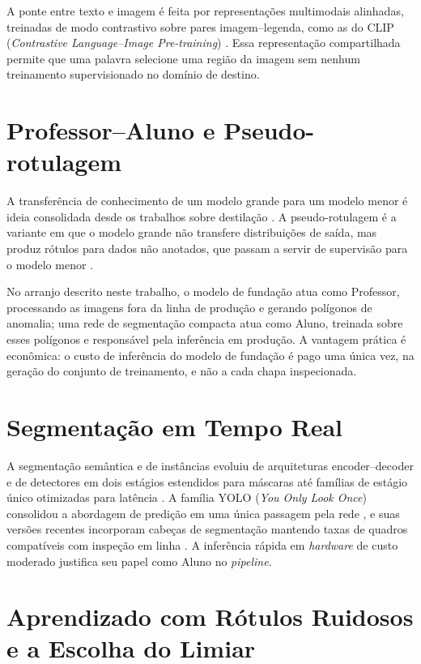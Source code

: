 A ponte entre texto e imagem é feita por representações multimodais alinhadas, treinadas de modo contrastivo sobre pares imagem--legenda, como as do CLIP (\textit{Contrastive Language--Image Pre-training}) \cite{clip_radford2021}. Essa representação compartilhada permite que uma palavra selecione uma região da imagem sem nenhum treinamento supervisionado no domínio de destino.

\section{Professor--Aluno e Pseudo-rotulagem}

A transferência de conhecimento de um modelo grande para um modelo menor é ideia consolidada desde os trabalhos sobre destilação \cite{distill_hinton2015}. A pseudo-rotulagem é a variante em que o modelo grande não transfere distribuições de saída, mas produz rótulos para dados não anotados, que passam a servir de supervisão para o modelo menor \cite{pseudolabel_lee2013}.

No arranjo descrito neste trabalho, o modelo de fundação atua como Professor, processando as imagens fora da linha de produção e gerando polígonos de anomalia; uma rede de segmentação compacta atua como Aluno, treinada sobre esses polígonos e responsável pela inferência em produção. A vantagem prática é econômica: o custo de inferência do modelo de fundação é pago uma única vez, na geração do conjunto de treinamento, e não a cada chapa inspecionada.

\section{Segmentação em Tempo Real}

A segmentação semântica e de instâncias evoluiu de arquiteturas encoder--decoder \cite{unet_ronneberger2015} e de detectores em dois estágios estendidos para máscaras \cite{maskrcnn_he2017} até famílias de estágio único otimizadas para latência \cite{segsurvey_minaee2021}. A família YOLO (\textit{You Only Look Once}) consolidou a abordagem de predição em uma única passagem pela rede \cite{yolo_redmon2016}, e suas versões recentes incorporam cabeças de segmentação mantendo taxas de quadros compatíveis com inspeção em linha \cite{yolo11_khanam2024}. A inferência rápida em \textit{hardware} de custo moderado justifica seu papel como Aluno no \textit{pipeline}.

\section{Aprendizado com Rótulos Ruidosos e a Escolha do Limiar}
\label{sec:ruidosos}

